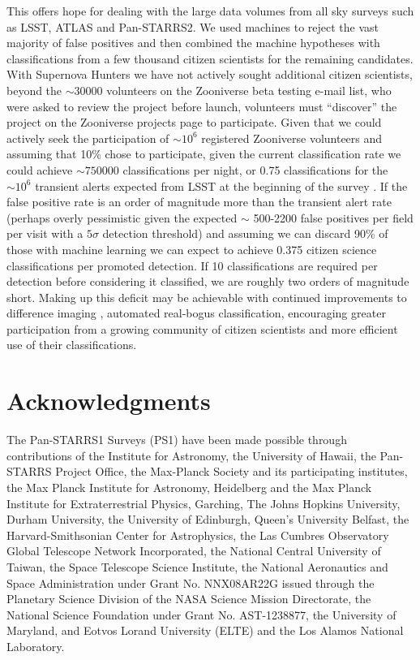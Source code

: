 \message{ !name(blank.tex)}\documentclass[a4paper,fleqn,usenatbib]{mnras}
\begin{document}
This offers hope for dealing with the large data volumes from all sky surveys such as LSST, ATLAS \citep{Tonry16} and Pan-STARRS2.  We used machines to reject the vast majority of false positives and then combined the machine hypotheses with classifications from a few thousand citizen scientists for the remaining candidates.  With Supernova Hunters we have not actively sought additional citizen scientists, beyond the $\sim30000$ volunteers on the Zooniverse beta testing e-mail list, who were asked to review the project before launch, volunteers must ``discover'' the project on the Zooniverse projects page to participate.  Given that we could actively seek the participation of $\sim 10^6$ registered Zooniverse volunteers and assuming that 10\% chose to participate, given the current classification rate we could achieve $\sim 750000$ classifications per night, or 0.75 classifications for the $\sim 10^6$ transient alerts expected from LSST at the beginning of the survey \citep{Ridgway14}.  If the false positive rate is an order of magnitude more than the transient alert rate (perhaps overly pessimistic given the expected $\sim$ 500-2200 false positives per field per visit \citep{Becker13} with a $5\sigma$ detection threshold) and assuming we can discard 90\% of those with machine learning we can expect to achieve 0.375 citizen science classifications per promoted detection.  If 10 classifications are required per detection before considering it classified, we are roughly two orders of magnitude short.  Making up this deficit may be achievable with continued improvements to difference imaging \citep{Zackay16}, automated real-bogus classification, encouraging greater participation from a growing community of citizen scientists and more efficient use of their classifications.

\section*{Acknowledgments}
The Pan-STARRS1 Surveys (PS1) have been made possible through contributions of the Institute for Astronomy, the University of Hawaii, the Pan-STARRS Project Office, the Max-Planck Society and its participating institutes, the Max Planck Institute for Astronomy, Heidelberg and the Max Planck Institute for Extraterrestrial Physics, Garching, The Johns Hopkins University, Durham University, the University of Edinburgh, Queen's University Belfast, the Harvard-Smithsonian Center for Astrophysics, the Las Cumbres Observatory Global Telescope Network Incorporated, the National Central University of Taiwan, the Space Telescope Science Institute, the National Aeronautics and Space Administration under Grant No. NNX08AR22G issued through the Planetary Science Division of the NASA Science Mission Directorate, the National Science Foundation under Grant No. AST-1238877, the University of Maryland, and Eotvos Lorand University (ELTE) and the Los Alamos National Laboratory.

 

\end{document}
